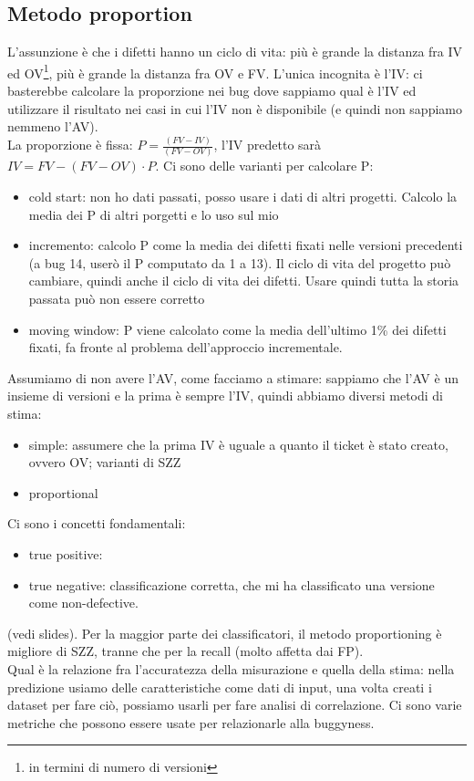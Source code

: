 \documentclass{article}
\begin{document}
\subsection{Metodo proportion}
L'assunzione è che i difetti hanno un ciclo di vita: più è grande la distanza fra IV ed OV\footnote{in termini di numero di versioni}, più è grande la distanza fra OV e FV. L'unica incognita è l'IV: ci basterebbe calcolare la proporzione nei bug dove sappiamo qual è l'IV ed utilizzare il risultato nei casi in cui l'IV non è disponibile (e quindi non sappiamo nemmeno l'AV).\\ La proporzione è  fissa: $P = \frac{(FV - IV)}{(FV - OV)}$, l'IV predetto sarà $IV = FV - (FV - OV)\cdot P$. Ci sono delle varianti per calcolare P:
\begin{itemize}
\item cold start: non ho dati passati, posso usare i dati di altri progetti. Calcolo la media dei P di altri porgetti e lo uso sul mio
\item incremento: calcolo P come la media dei difetti fixati nelle versioni precedenti (a bug 14, userò il P computato da 1 a 13). Il ciclo di vita del progetto può cambiare, quindi anche il ciclo di vita dei difetti. Usare quindi tutta la storia passata può non essere corretto
\item moving window: P viene calcolato come la media dell'ultimo 1\% dei difetti fixati, fa fronte al problema dell'approccio incrementale.
\end{itemize}
Assumiamo di non avere l'AV, come facciamo a stimare: sappiamo che l'AV è un insieme di versioni e la prima è sempre l'IV, quindi abbiamo diversi metodi di stima:
\begin{itemize}
\item simple: assumere che la prima IV è uguale a quanto il ticket è stato creato, ovvero OV; varianti di SZZ
\item proportional
\end{itemize}
Ci sono i concetti fondamentali:
\begin{itemize}
\item true positive: 
\item true negative: classificazione corretta, che mi ha classificato una versione come non-defective.
\end{itemize}
(vedi slides). Per la maggior parte dei classificatori, il metodo proportioning è migliore di SZZ, tranne che per la recall (molto affetta dai FP).\\ Qual è la relazione fra l'accuratezza della misurazione e quella della stima: nella predizione usiamo delle caratteristiche come dati di input, una volta creati i dataset per fare ciò, possiamo usarli per fare analisi di correlazione. Ci sono varie metriche che possono essere usate per relazionarle alla buggyness.
\end{document}
